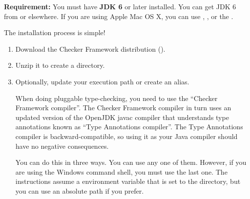 \textbf{Requirement:}
You must have \textbf{JDK 6} or later installed.  You can get JDK 6 from
or elsewhere.  If you are using Apple Mac OS X, you can use
,
,
or the .

The installation process is simple!
\begin{enumerate}
\item
  Download the Checker Framework distribution
  ().
\item 
  Unzip it to create a  directory.


\item
  Optionally, update your execution path or create an alias.

  When doing pluggable type-checking, you need to use the ``Checker Framework compiler''.  The
  Checker Framework compiler in turn uses an updated version of the OpenJDK javac compiler that
  understands type annotations known as ``Type Annotations compiler''.    The Type Annotations compiler is
  backward-compatible, so using it as your Java compiler should have no negative consequences.

  You can do this in three ways.  You can use any one of them.  However, if
  you are using the Windows command shell, you must use the last one.  The
  instructions assume a  environment variable that is set
  to the  directory, but you can
  use an absolute path if you prefer.



\end{enumerate}

